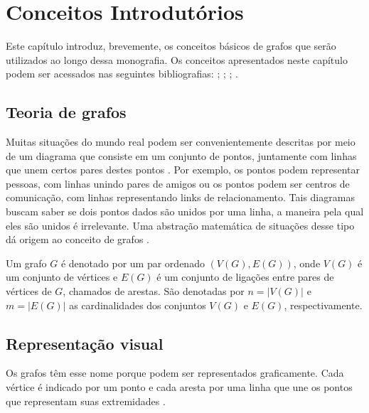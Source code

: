\graphicspath{{\currfiledir/images/}}

\chapter{Conceitos Introdutórios}
Este capítulo introduz, brevemente, os conceitos básicos de grafos que serão utilizados ao longo dessa monografia. Os conceitos apresentados neste capítulo podem ser acessados nas seguintes bibliografias: \cite{bondymurty1976}; \cite{west2002}; \cite{bondymurty2008}; \cite{feofiloff2018}.

\section{Teoria de grafos}
Muitas situações do mundo real podem ser convenientemente descritas por meio de um diagrama que consiste em um conjunto de pontos, juntamente com linhas que unem certos pares destes pontos \cite{bondymurty1976}. Por exemplo, os pontos podem representar pessoas, com linhas unindo pares de amigos ou os pontos podem ser centros de comunicação, com linhas representando links de relacionamento. Tais diagramas buscam saber se dois pontos dados são unidos por uma linha, a maneira pela qual eles são unidos é irrelevante. Uma abstração matemática de situações desse tipo dá origem ao conceito de grafos \cite{bondymurty2008}.

\begin{definition}
    Um grafo $G$ é denotado por um par ordenado $(V(G), E(G))$, onde $V(G)$ é um conjunto de vértices e $E(G)$ é um conjunto de ligações entre pares de vértices de $G$, chamados de arestas. São denotadas por $n = |V(G)|$ e $m = |E(G)|$ as cardinalidades dos conjuntos $V(G)$ e $E(G)$, respectivamente.
\end{definition}

\section{Representação visual}
Os grafos têm esse nome porque podem ser representados graficamente. Cada vértice é indicado por um ponto e cada aresta por uma linha que une os pontos que representam suas extremidades \cite{bondymurty1976}.


